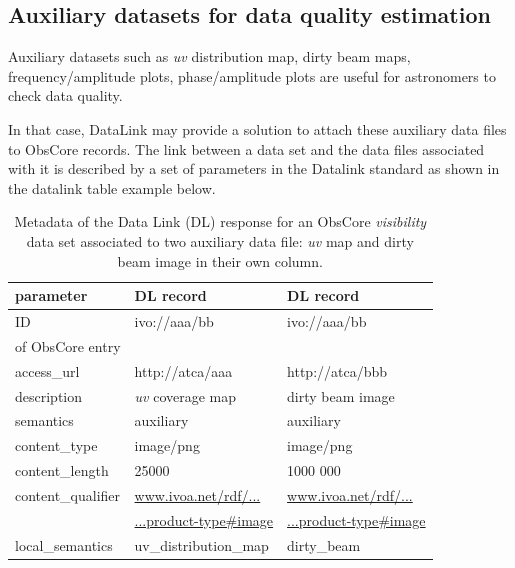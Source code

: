 \documentclass[11pt,a4paper]{ivoa}
\begin{document}
\subsection{Auxiliary datasets  for data quality estimation}

Auxiliary datasets such as  \emph{uv} distribution map, dirty beam maps, frequency/amplitude plots, phase/amplitude plots are useful for astronomers to check data quality.

In that case,  DataLink \citep{2023ivoa.spec.1215B} may provide a solution to attach these auxiliary data files to ObsCore records. The link between a data set and the data files associated with it is described by a set of parameters in  the Datalink standard as  shown in the datalink table example below.
\begin{table}[h]
\begin{flushleft}
\begin{tabular}{|l|l|l|}
\hline
{\bf parameter} & {\bf DL record } & {\bf DL record}\\
\hline
ID   & ivo://aaa/bb & ivo://aaa/bb  \\
of ObsCore entry &  &   \\
\hline
access\_url  &http://atca/aaa & http://atca/bbb\\
\hline
description  & \emph{uv} coverage map   & dirty beam image  \\
\hline
semantics    & auxiliary&  auxiliary\\
\hline
content\_type  & image/png& image/png \\
\hline
content\_length & 25000 & 1000 000\\
\hline
content\_qualifier & \footnotesize{\url{www.ivoa.net/rdf/...}} &  \footnotesize{\url{www.ivoa.net/rdf/...}}\\
& \footnotesize{\url{...product-type#image}} &  \footnotesize{\url{...product-type#image}}\\
\hline
local\_semantics &   uv\_distribution\_map& dirty\_beam  \\
\hline
\end{tabular}
\end{flushleft}
\caption{Metadata of the Data Link (DL) response for an ObsCore \emph{visibility} data set  associated to two auxiliary data file:  \emph{uv} map and dirty beam image in their own column. }
\label{fig:linkFields}
\end{table}
\end{document}
